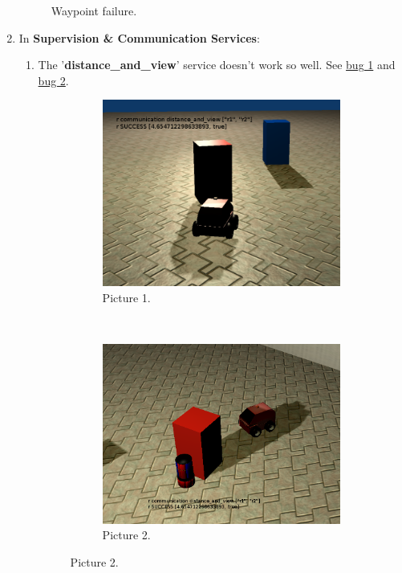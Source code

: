 \begin{enumerate}
\begin{figure}[!ht]
\begin{center}
\end{center}
\caption{Waypoint failure. \label{Waypoint_failure}}
\end{figure}


\item In \textbf{Supervision \& Communication Services}:
\begin{enumerate}

\item The '\textbf{distance\_and\_view}' service doesn't work so well. See \hyperref[view_bug1]{bug 1} and \hyperref[view_bug2]{bug 2}.

\begin{figure}[!ht] %
\begin{center}
\begin{subfigure}[!ht]{0.48\textwidth}
  \centering
  \includegraphics[width=\textwidth]{Bug_Pics/Distance_and_View/distance_and_view_11.png}
  \caption{Picture 1.}
\end{subfigure}
~
\begin{subfigure}[!ht]{0.48\textwidth}
  \centering
  \includegraphics[width=\textwidth]{Bug_Pics/Distance_and_View/distance_and_view_12.png}
  \caption{Picture 2.}
\end{subfigure}


\end{center}
\end{figure}
\end{enumerate}
\end{enumerate}
